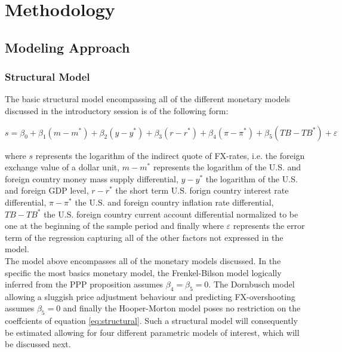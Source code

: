 \section{Methodology}
\label{sec:part2}

\subsection{Modeling Approach}
\label{sub:models}

\subsubsection{Structural Model}

The basic structural model encompassing all of the different monetary models
discussed in the introductory session is of the following form:

\begin{equation} \label{eq:structural}
  s = \beta_{0} + \beta_{1}(m - m^{*}) + \beta_{2}(y-y^{*}) + \beta_{3}(r-r^{*})
  + \beta_{4}(\pi - \pi^{*}) + \beta_{5}(TB - TB^{*}) + \varepsilon
\end{equation}

where $s$ represents the logarithm of the indirect quote of FX-rates, i.e. the
foreign exchange value of a dollar unit, $m-m^{*}$ represents the logarithm of
the U.S. and foreign country money mass supply differential, $y-y^{*}$ the logarithm
of the U.S. and foreign GDP level, $r-r^{*}$ the short term U.S. forign country
interest rate differential, $\pi - \pi^{*}$ the U.S. and foreign country inflation
rate differential, $TB - TB^{*}$ the U.S. foreign country current account differential
normalized to be one at the beginning of the sample period and finally where
$\varepsilon$ represents the error term of the regression capturing all of the
other factors not expressed in the model.\\
The model above encompasses all of the monetary models discussed. In the specific
the most basics monetary model, the Frenkel-Bilson model logically inferred from
the PPP proposition assumes $\beta_{4} = \beta_{5} = 0$. The Dornbusch model allowing
a sluggish price adjustment behaviour and predicting FX-overshooting
assumes $\beta_{5} = 0$ and finally the Hooper-Morton model poses no restriction on
the coeffcients of equation \ref{eq:structural}. Such a structural model will consequently
be estimated allowing for four different parametric models of interest, which will be discussed next.

